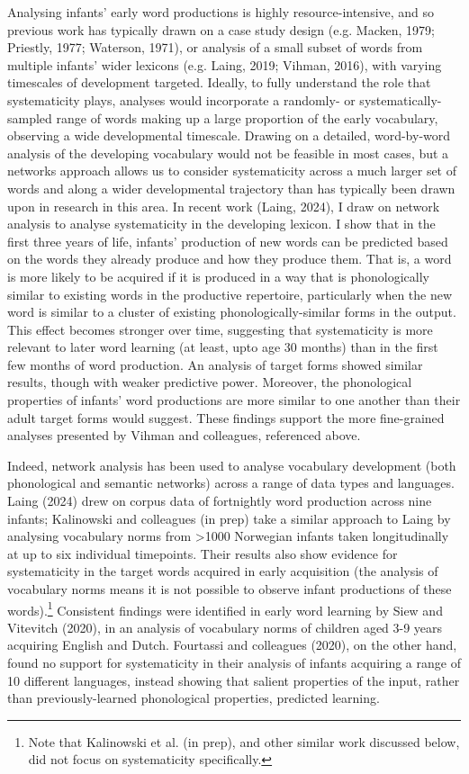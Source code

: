 \documentclass[
  man]{apa6}
\begin{document}
Analysing infants' early word productions is highly resource-intensive, and so previous work has typically drawn on a case study design (e.g. Macken, 1979; Priestly, 1977; Waterson, 1971), or analysis of a small subset of words from multiple infants' wider lexicons (e.g. Laing, 2019; Vihman, 2016), with varying timescales of development targeted. Ideally, to fully understand the role that systematicity plays, analyses would incorporate a randomly- or systematically-sampled range of words making up a large proportion of the early vocabulary, observing a wide developmental timescale. Drawing on a detailed, word-by-word analysis of the developing vocabulary would not be feasible in most cases, but a networks approach allows us to consider systematicity across a much larger set of words and along a wider developmental trajectory than has typically been drawn upon in research in this area. In recent work (Laing, 2024), I draw on network analysis to analyse systematicity in the developing lexicon. I show that in the first three years of life, infants' production of new words can be predicted based on the words they already produce and how they produce them. That is, a word is more likely to be acquired if it is produced in a way that is phonologically similar to existing words in the productive repertoire, particularly when the new word is similar to a cluster of existing phonologically-similar forms in the output. This effect becomes stronger over time, suggesting that systematicity is more relevant to later word learning (at least, upto age 30 months) than in the first few months of word production. An analysis of target forms showed similar results, though with weaker predictive power. Moreover, the phonological properties of infants' word productions are more similar to one another than their adult target forms would suggest. These findings support the more fine-grained analyses presented by Vihman and colleagues, referenced above.

Indeed, network analysis has been used to analyse vocabulary development (both phonological and semantic networks) across a range of data types and languages. Laing (2024) drew on corpus data of fortnightly word production across nine infants; Kalinowski and colleagues (in prep) take a similar approach to Laing by analysing vocabulary norms from \textgreater1000 Norwegian infants taken longitudinally at up to six individual timepoints. Their results also show evidence for systematicity in the target words acquired in early acquisition (the analysis of vocabulary norms means it is not possible to observe infant productions of these words).\footnote{Note that Kalinowski et al. (in prep), and other similar work discussed below, did not focus on systematicity specifically.} Consistent findings were identified in early word learning by Siew and Vitevitch (2020), in an analysis of vocabulary norms of children aged 3-9 years acquiring English and Dutch. Fourtassi and colleagues (2020), on the other hand, found no support for systematicity in their analysis of infants acquiring a range of 10 different languages, instead showing that salient properties of the input, rather than previously-learned phonological properties, predicted learning.
\end{document}
